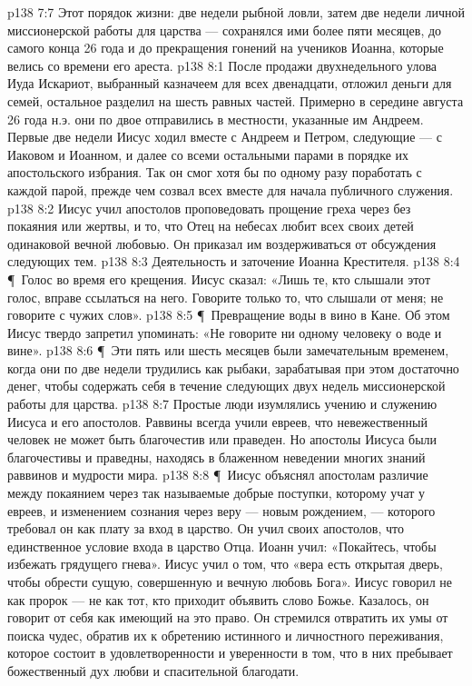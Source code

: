 \vs p138 7:7 Этот порядок жизни: две недели рыбной ловли, затем две недели личной миссионерской работы для царства --- сохранялся ими более пяти месяцев, до самого конца 26 года и до прекращения гонений на учеников Иоанна, которые велись со времени его ареста.
\vs p138 8:1 После продажи двухнедельного улова Иуда Искариот, выбранный казначеем для всех двенадцати, отложил деньги для семей, остальное разделил на шесть равных частей. Примерно в середине августа 26 года н.э. они по двое отправились в местности, указанные им Андреем. Первые две недели Иисус ходил вместе с Андреем и Петром, следующие --- с Иаковом и Иоанном, и далее со всеми остальными парами в порядке их апостольского избрания. Так он смог хотя бы по одному разу поработать с каждой парой, прежде чем созвал всех вместе для начала публичного служения.
\vs p138 8:2 Иисус учил апостолов проповедовать прощение греха через  без покаяния или жертвы, и то, что Отец на небесах любит всех своих детей одинаковой вечной любовью. Он приказал им воздерживаться от обсуждения следующих тем.
\vs p138 8:3 \bibnobreakspace Деятельность и заточение Иоанна Крестителя.
\vs p138 8:4 \P\ \bibnobreakspace Голос во время его крещения. Иисус сказал: «Лишь те, кто слышали этот голос, вправе ссылаться на него. Говорите только то, что слышали от меня; не говорите с чужих слов».
\vs p138 8:5 \P\ \bibnobreakspace Превращение воды в вино в Кане. Об этом Иисус твердо запретил упоминать: «Не говорите ни одному человеку о воде и вине».
\vs p138 8:6 \P\ Эти пять или шесть месяцев были замечательным временем, когда они по две недели трудились как рыбаки, зарабатывая при этом достаточно денег, чтобы содержать себя в течение следующих двух недель миссионерской работы для царства.
\vs p138 8:7 Простые люди изумлялись учению и служению Иисуса и его апостолов. Раввины всегда учили евреев, что невежественный человек не может быть благочестив или праведен. Но апостолы Иисуса были благочестивы и праведны, находясь в блаженном неведении многих знаний раввинов и мудрости мира.
\vs p138 8:8 \P\ Иисус объяснял апостолам различие между покаянием через так называемые добрые поступки, которому учат у евреев, и изменением сознания через веру --- новым рождением, --- которого требовал он как плату за вход в царство. Он учил своих апостолов, что  единственное условие входа в царство Отца. Иоанн учил: «Покайтесь, чтобы избежать грядущего гнева». Иисус учил о том, что «вера есть открытая дверь, чтобы обрести сущую, совершенную и вечную любовь Бога». Иисус говорил не как пророк --- не как тот, кто приходит объявить слово Божье. Казалось, он говорит от себя как имеющий на это право. Он стремился отвратить их умы от поиска чудес, обратив их к обретению истинного и личностного переживания, которое состоит в удовлетворенности и уверенности в том, что в них пребывает божественный дух любви и спасительной благодати.
